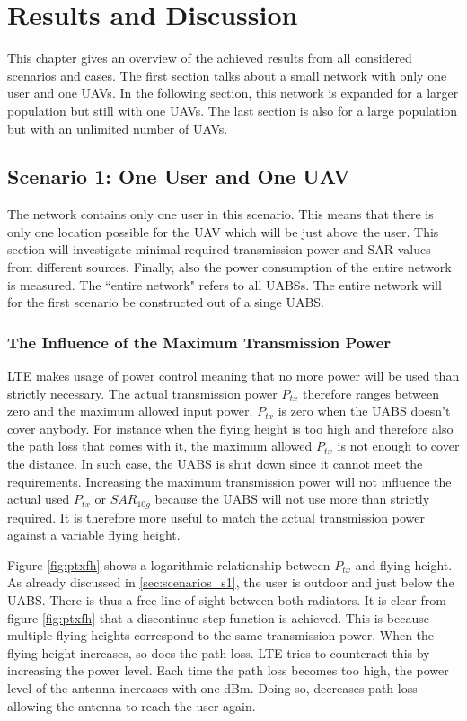 \chapter{Results and Discussion}
\label{chap:results}

This chapter gives an overview of the achieved results from all considered scenarios and cases.
The first section talks about a small network with only one user and one \gls{UAV}s. In 
the following section, this network is expanded for a larger population but still with one \gls{UAV}s.
The last section is also for a large population but with an unlimited number of \gls{UAV}s.

\section{Scenario 1: One User and One \gls{UAV}}
The network contains only one user in this scenario. This means that there is only one location possible for the \gls{UAV} which will 
be just above 
the user. This section will investigate minimal required transmission power and SAR values from different sources.
Finally, also the power consumption of the entire network is measured. The  ``entire network" refers to all \gls{UABS}s. The entire network 
will for the first scenario be constructed out of a singe \gls{UABS}.

\subsection{The Influence of the Maximum Transmission Power}
\label{s1a}
\gls{LTE} makes usage of power control meaning that no more power will be used than strictly necessary. The actual 
transmission power $P_{tx}$ therefore ranges between zero and the maximum allowed input power. $P_{tx}$ is zero when the \gls{UABS} doesn't cover anybody.
For instance when the flying height is too high and therefore also the path loss that comes with it, the maximum allowed $P_{tx}$ is not enough to cover 
the distance. In such case, the \gls{UABS} is shut down since it cannot meet the requirements.
Increasing the maximum transmission power will not influence the actual used $P_{tx}$ or $SAR_{10g}$ because the \gls{UABS} will not use more
than strictly required. It is therefore more useful to match the actual transmission power against a variable flying height. 

Figure \ref{fig:ptxfh} shows a logarithmic relationship between $P_{tx}$ and flying height.
As already discussed in \ref{sec:scenarios_s1}, the user is outdoor and just below the \gls{UABS}. There is thus a free line-of-sight between both
radiators. It is clear from figure \ref{fig:ptxfh} that a discontinue step function is achieved. This is because multiple flying heights correspond to the same transmission power.
When the flying height increases, so does the path loss. \gls{LTE} tries to counteract this by increasing the power level. Each time 
the path loss becomes too high, the power level of the antenna increases with one dBm. Doing so, decreases path loss allowing the antenna to reach
the user again. 

